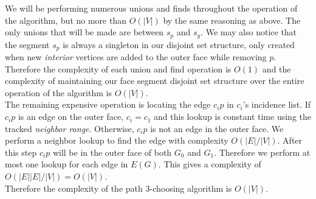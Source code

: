 \documentclass[11pt,letter]{article}
\begin{document}
\noindent We will be performing numerous unions and finds throughout the operation of the algorithm, but no more
than $O(|V|)$ by the same reasoning as above. The only unions that will be made are between $s_p$ and
$s_y$. We may also notice that the segment $s_p$ is always a singleton in our disjoint set structure, only created
when new \emph{interior} vertices are added to the outer face while removing $p$. Therefore the complexity of
each union and find operation is $O(1)$ and the complexity of maintaining our face segment 
disjoint set structure over the entire operation of the algorithm is $O(|V|)$.\\

\noindent The remaining expensive operation
is locating the edge $c_ip$ in $c_i$'s incidence list. If $c_ip$ is an edge on the outer face, $c_i=c_1$ and
this lookup is constant time using the tracked \emph{neighbor range}. Otherwise, $c_ip$ is not an edge in
the outer face. We perform a neighbor lookup to find the edge with complexity $O(|E|/|V|)$.
After this step $c_ip$ will be in the outer face of both $G_0$ and $G_1$. Therefore we perform at most one lookup
for each edge in $E(G)$. This gives a complexity of $O(|E||E|/|V|)=O(|V|)$.\\

\noindent Therefore the complexity of the path $3$-choosing algorithm is $O(|V|)$.

\begin{comment}
\begin{algorithm}
\LinesNumbered
\DontPrintSemicolon
\KwIn{Plane graph $G$ and paths $P=p_0\ldots p_n$ and $Q=q_0\ldots q_m$}
\Begin{
	\Repeat{$t_0\not\in P\cup Q$} {
		$t_0\longleftarrow$ vertex forming face with $p_0$ and $q_0$\;
		\If{$t_0 = p_1$} {
			$P\longleftarrow P - p_0$\;
		}
		\ElseIf{$t_0 = q_1$} {
			$Q\longleftarrow Q - q_0$\; 
		}
	}
	\Repeat{$t_1\not\in P\cup Q$} {
		$t_1\longleftarrow$ vertex forming face with $p_n$ and $q_m$\;
		\If{$t_1 = p_{n-1}$} {
			$P\longleftarrow P - p_n$\;
		}
		\ElseIf{$t_1 = q_{m-1}$} {
			$Q\longleftarrow Q - q_m$\; 
		}
	}
	perform BFS starting at $t_1$\;
	\If{BFS finds $t_0$} {
		$T\longleftarrow$ BFS path $t_0$ to $t_1$\;
	}
	\Else {
		we hit an vertex $u$ with neighbors $p_i\in P$ and $q_j\in Q$\;
		$T\longleftarrow$ BFS path $u$ to $t_1$\;
		recurse on subgraph bounded by $p_0\ldots p_i$ and $q_0\ldots q_j$\;
		$P\longleftarrow p_i\ldots p_n$\;
		$Q\longleftarrow q_j\ldots q_m$\;
	}
	recurse on subgraph bounded by $P$ and $T$\;
	recurse on subgraph bounded by $T$ and $Q$\;
}
\caption{Path 3-Color}
\end{algorithm}

\end{comment}
\end{document}
